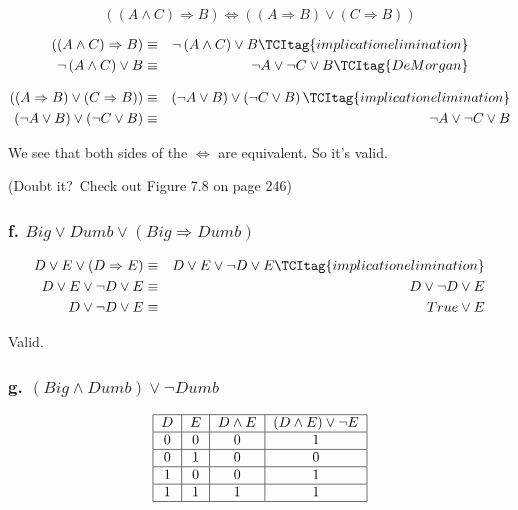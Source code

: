 \documentclass{article}
\begin{document}
\[
\left( \left( A\wedge C\right) \Rightarrow B\right) \Leftrightarrow \left(
\left( A\Rightarrow B\right) \vee \left( C\Rightarrow B\right) \right) 
\]

\begin{eqnarray}
\left( \left( A\wedge C\right) \Rightarrow B\right)  &\equiv &\lnot \left(
A\wedge C\right) \vee B  \TCItag{implication elimination} \\
\lnot \left( A\wedge C\right) \vee B &\equiv &\lnot A\vee \lnot C\vee B 
\TCItag{De Morgan}
\end{eqnarray}

\begin{eqnarray}
\left( \left( A\Rightarrow B\right) \vee \left( C\Rightarrow B\right)
\right)  &\equiv &\left( \lnot A\vee B\right) \vee \left( \lnot C\vee
B\right)   \TCItag{implication elimination} \\
\left( \lnot A\vee B\right) \vee \left( \lnot C\vee B\right)  &\equiv &\lnot
A\vee \lnot C\vee B  \nonumber
\end{eqnarray}

We see that both sides of the $\Leftrightarrow $ are equivalent. So it's
valid.

(Doubt it?\ Check out Figure 7.8 on page 246)

\subsubsection{f. $Big\vee Dumb\vee \left( Big\Rightarrow Dumb\right) $}

\begin{eqnarray}
D\vee E\vee \left( D\Rightarrow E\right)  &\equiv &D\vee E\vee \lnot D\vee E
\TCItag{implication elimination} \\
D\vee E\vee \lnot D\vee E &\equiv &D\vee \lnot D\vee E  \nonumber \\
D\vee \lnot D\vee E &\equiv &True\vee E  \nonumber
\end{eqnarray}

Valid.

\subsubsection{g. $\left( Big\wedge Dumb\right) \vee \lnot Dumb$}

\[
\begin{tabular}{|c|c|c|c|}
\hline
$D$ & $E$ & $D\wedge E$ & $\left( D\wedge E\right) \vee \lnot E$ \\ \hline
0 & 0 & 0 & 1 \\ \hline
0 & 1 & 0 & 0 \\ \hline
1 & 0 & 0 & 1 \\ \hline
1 & 1 & 1 & 1 \\ \hline
\end{tabular}%
\]
\end{document}
